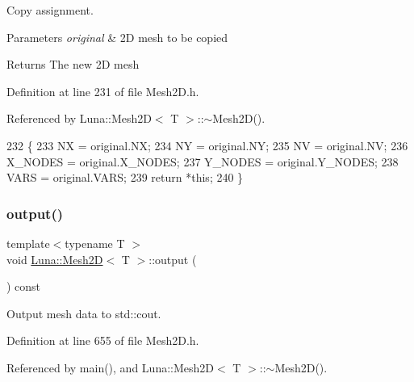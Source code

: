 Copy assignment. 


\begin{DoxyParams}{Parameters}
{\em original} & 2D mesh to be copied \\
\hline
\end{DoxyParams}
\begin{DoxyReturn}{Returns}
The new 2D mesh 
\end{DoxyReturn}


Definition at line 231 of file Mesh2\+D.\+h.



Referenced by Luna\+::\+Mesh2\+D$<$ T $>$\+::$\sim$\+Mesh2\+D().


\begin{DoxyCode}
232   \{
233     NX = original.NX;
234     NY = original.NY;
235     NV = original.NV;
236     X\_NODES = original.X\_NODES;
237     Y\_NODES =  original.Y\_NODES;
238     VARS = original.VARS;
239     \textcolor{keywordflow}{return} *\textcolor{keyword}{this};
240   \}
\end{DoxyCode}
\mbox{\label{classLuna_1_1Mesh2D_a904628aa8c8e0b4ca4a0d794f52c8899}} 
\subsubsection{\texorpdfstring{output()}{output()}\hspace{0.1cm}{\footnotesize\ttfamily [1/2]}}
{\footnotesize\ttfamily template$<$typename T $>$ \\
void \hyperlink{classLuna_1_1Mesh2D}{Luna\+::\+Mesh2D}$<$ T $>$\+::output (\begin{DoxyParamCaption}{ }\end{DoxyParamCaption}) const}



Output mesh data to std\+::cout. 



Definition at line 655 of file Mesh2\+D.\+h.



Referenced by main(), and Luna\+::\+Mesh2\+D$<$ T $>$\+::$\sim$\+Mesh2\+D().


